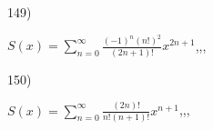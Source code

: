 \documentclass[11pt, ukrainian]{article}
\begin{document}
\par
\vspace{0.9cm}
149) \space 
{%
{$S(x)=\sum\limits_{n=0}^{\infty}{\frac{{(-1)^n}{(n!)^2}}{(2n+1)!}}{x^{{2n+1}}}$},,, \par \smallskip  
}
\par
\vspace{0.9cm}
150) \space 
{%
{$S(x)=\sum\limits_{n=0}^{\infty}{\frac{(2n)!}{n!(n+1)!}}{x^{{n+1}}}$},,, \par \smallskip  
}
\par
\vspace{0.9cm}
\end{document}
